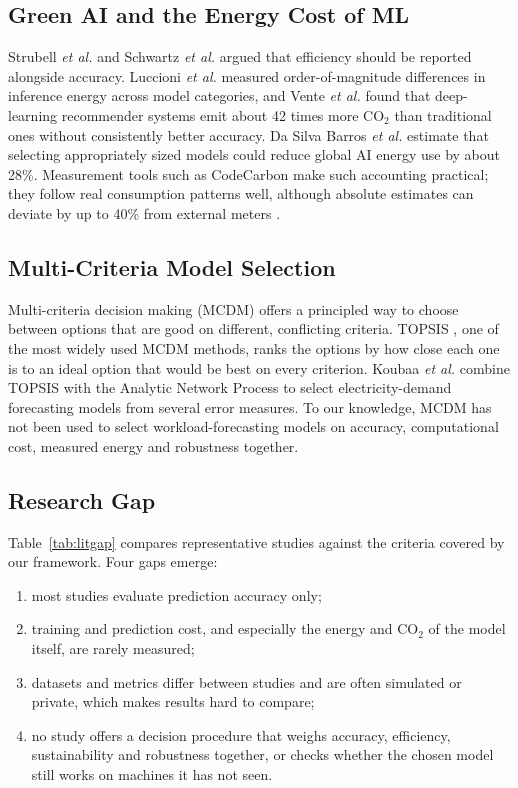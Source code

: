 \documentclass[conference,letterpaper,10pt]{IEEEtran}
\begin{document}
\subsection{Green AI and the Energy Cost of ML}
Strubell \textit{et al.} \cite{strubell2019energy} and Schwartz \textit{et al.} \cite{schwartz2020green} argued that efficiency should be reported alongside accuracy. Luccioni \textit{et al.} \cite{luccioni2024power} measured order-of-magnitude differences in inference energy across model categories, and Vente \textit{et al.} \cite{vente2024clicks} found that deep-learning recommender systems emit about 42 times more CO$_2$ than traditional ones without consistently better accuracy. Da Silva Barros \textit{et al.} \cite{barros2025small} estimate that selecting appropriately sized models could reduce global AI energy use by about 28\%. Measurement tools such as CodeCarbon \cite{courty2024codecarbon} make such accounting practical; they follow real consumption patterns well, although absolute estimates can deviate by up to 40\% from external meters \cite{bouza2023estimate,fischer2025groundtruth}.

\subsection{Multi-Criteria Model Selection}
Multi-criteria decision making (MCDM) offers a principled way to choose between options that are good on different, conflicting criteria. TOPSIS \cite{hwang1981topsis}, one of the most widely used MCDM methods, ranks the options by how close each one is to an ideal option that would be best on every criterion. Koubaa \textit{et al.} \cite{koubaa2024mcdm} combine TOPSIS with the Analytic Network Process to select electricity-demand forecasting models from several error measures. To our knowledge, MCDM has not been used to select workload-forecasting models on accuracy, computational cost, measured energy and robustness together.

\subsection{Research Gap}
Table~\ref{tab:litgap} compares representative studies against the criteria covered by our framework. Four gaps emerge:
\begin{enumerate}
  \item most studies evaluate prediction accuracy only;
  \item training and prediction cost, and especially the energy and CO$_2$ of the model itself, are rarely measured;
  \item datasets and metrics differ between studies and are often simulated or private, which makes results hard to compare;
  \item no study offers a decision procedure that weighs accuracy, efficiency, sustainability and robustness together, or checks whether the chosen model still works on machines it has not seen.
\end{enumerate}
\end{document}
